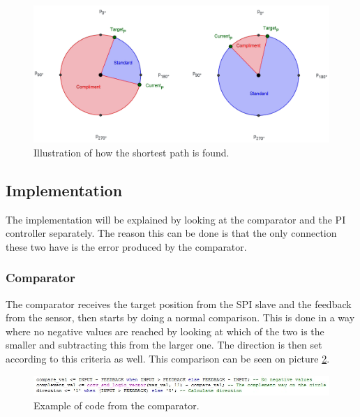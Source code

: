 \begin{figure}[h!]
\centering
\includegraphics[scale=0.4]{Billeder/FPGA/Shortest_Comp_Short_and_Long.png}
\caption{Illustration of how the shortest path is found.}
\label{fig:Shortest_Comp_Short_and_Long}
\end{figure}


\subsection{Implementation}

The implementation will be explained by looking at the comparator and the PI controller separately. The reason this can be done is that the only connection these two have is the error produced by the comparator.


\subsubsection{Comparator}

The comparator receives the target position from the SPI slave and the feedback from the sensor, then starts by doing a normal comparison. This is done in a way where no negative values are reached by looking at which of the two is the smaller and subtracting this from the larger one. The direction is then set according to this criteria as well. This comparison can be seen on picture \ref{fig:Comperator code exaple}.


\begin{figure}[h!]
\centering
\includegraphics[scale=0.7]{Billeder/FPGA/Comperator_code_exaple.jpg}
\caption{Example of code from the comparator.}
\label{fig:Comperator code exaple}
\end{figure}


